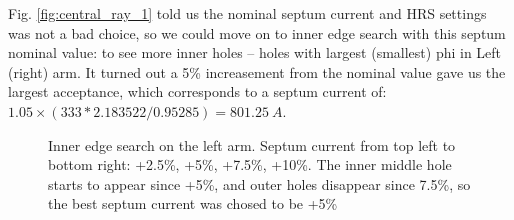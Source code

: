 Fig. \ref{fig:central_ray_1} told us the nominal septum current and HRS settings was not a bad choice,
so we could move on to inner edge search with this septum nominal value: to
see more inner holes -- holes with largest (smallest) phi in Left (right) arm.
It turned out a 5\% increasement from the nominal value gave us the largest 
acceptance, which corresponds to a septum current of: $1.05 \times (333*2.183522/0.95285) = 801.25 \ A$.
\begin{figure}[H]
    \caption{Inner edge search on the left arm. Septum current from top left
    to bottom right: +2.5\%, +5\%, +7.5\%, +10\%. The inner middle hole starts
    to appear since +5\%, and outer holes disappear since 7.5\%, so the best
    septum current was chosed to be +5\%}
\end{figure}

